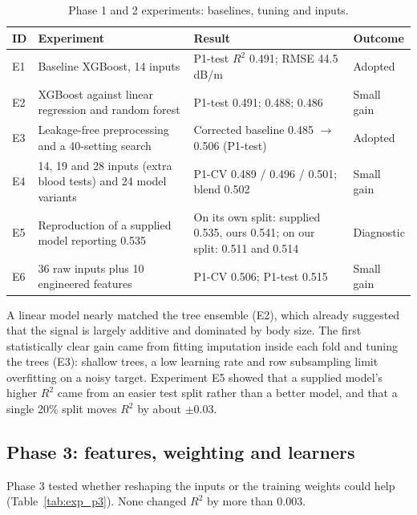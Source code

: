 \begin{table}[htbp]
\centering
\caption{Phase 1 and 2 experiments: baselines, tuning and inputs.}
\label{tab:exp_p1}
\begin{tabular}{p{0.8cm}p{4.2cm}p{5.2cm}p{1.8cm}}
\toprule
ID & Experiment & Result & Outcome \\
\midrule
E1 & Baseline XGBoost, 14 inputs & P1-test $R^2$ 0.491; RMSE 44.5 dB/m & Adopted \\
E2 & XGBoost against linear regression and random forest & P1-test 0.491; 0.488; 0.486 & Small gain \\
E3 & Leakage-free preprocessing and a 40-setting search & Corrected baseline 0.485 $\rightarrow$ 0.506 (P1-test) & Adopted \\
E4 & 14, 19 and 28 inputs (extra blood tests) and 24 model variants & P1-CV 0.489 / 0.496 / 0.501; blend 0.502 & Small gain \\
E5 & Reproduction of a supplied model reporting 0.535 & On its own split: supplied 0.535, ours 0.541; on our split: 0.511 and 0.514 & Diagnostic \\
E6 & 36 raw inputs plus 10 engineered features & P1-CV 0.506; P1-test 0.515 & Small gain \\
\bottomrule
\end{tabular}
\end{table}

A linear model nearly matched the tree ensemble (E2), which already suggested
that the signal is largely additive and dominated by body size. The first
statistically clear gain came from fitting imputation inside each fold and
tuning the trees (E3): shallow trees, a low learning rate and row subsampling
limit overfitting on a noisy target. Experiment E5 showed that a supplied
model's higher $R^2$ came from an easier test split rather than a better
model, and that a single 20\% split moves $R^2$ by about $\pm0.03$.

\subsection{Phase 3: features, weighting and learners}

Phase 3 tested whether reshaping the inputs or the training weights could
help (Table~\ref{tab:exp_p3}). None changed $R^2$ by more than 0.003.

